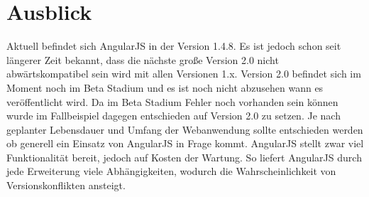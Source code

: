 \section{Ausblick}
Aktuell befindet sich AngularJS in der Version 1.4.8.
Es ist jedoch schon seit längerer Zeit bekannt, dass die nächste große Version 2.0 nicht abwärtskompatibel sein wird mit allen Versionen 1.x.
Version 2.0 befindet sich im Moment noch im Beta Stadium und es ist noch nicht abzusehen wann es veröffentlicht wird.
Da im Beta Stadium Fehler noch vorhanden sein können wurde im Fallbeispiel dagegen entschieden auf Version 2.0 zu setzen.
Je nach geplanter Lebensdauer und Umfang der Webanwendung sollte entschieden werden ob generell ein Einsatz von AngularJS in Frage kommt.
AngularJS stellt zwar viel Funktionalität bereit, jedoch auf Kosten der Wartung.
So liefert AngularJS durch jede Erweiterung viele Abhängigkeiten, wodurch die Wahrscheinlichkeit von Versionskonflikten ansteigt.